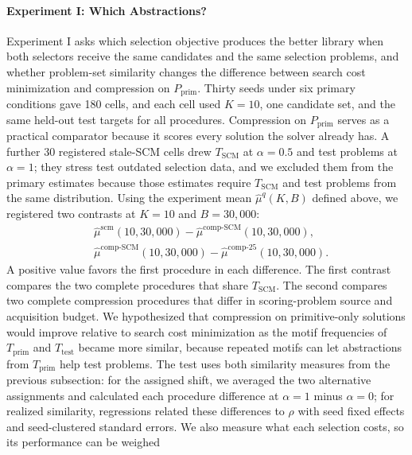 \documentclass[10pt]{article}
\begin{document}
\paragraph{Experiment I: Which Abstractions?}
Experiment I asks which selection objective produces the better library when
both selectors receive the same candidates and the same selection problems,
and whether problem-set similarity changes the difference between search
cost minimization and compression on $P_{\mathrm{prim}}$. Thirty seeds
under six primary conditions gave 180 cells, and each cell used $K=10$, one
candidate set, and the same held-out test targets for all procedures.
Compression on $P_{\mathrm{prim}}$ serves as a practical comparator
because it scores every solution the solver already has. A further 30
registered stale-SCM cells drew $T_{\mathrm{SCM}}$ at $\alpha=0.5$ and test
problems at $\alpha=1$; they stress test outdated selection data, and we
excluded them from the primary estimates because those estimates require
$T_{\mathrm{SCM}}$ and test problems from the same distribution.
Using the experiment mean $\widehat\mu^{q}(K,B)$ defined above, we registered
two contrasts at $K=10$ and $B=30{,}000$:
\begin{equation}
  \begin{aligned}
    &\widehat\mu^{\mathrm{scm}}(10,30{,}000)
      -\widehat\mu^{\mathrm{comp\text{-}SCM}}(10,30{,}000),\\
    &\widehat\mu^{\mathrm{comp\text{-}SCM}}(10,30{,}000)
      -\widehat\mu^{\mathrm{comp\text{-}25}}(10,30{,}000).
  \end{aligned}
\end{equation}
A positive value favors the first procedure in each difference. The first
contrast compares the two complete procedures that share
$T_{\mathrm{SCM}}$. The second compares two complete compression
procedures that differ in scoring-problem source and acquisition budget.
We hypothesized that compression on primitive-only solutions would
improve relative to search cost minimization as the motif frequencies of
$T_{\mathrm{prim}}$ and $T_{\mathrm{test}}$ became more
similar, because repeated motifs can let abstractions from
$T_{\mathrm{prim}}$ help test problems. The test uses both similarity
measures from the previous subsection: for the assigned shift, we averaged
the two alternative assignments and calculated each procedure difference at
$\alpha=1$ minus $\alpha=0$; for realized similarity, regressions related
these differences to $\rho$ with seed fixed effects and seed-clustered
standard errors.
We also measure what each selection costs, so its performance can be weighed
\end{document}
